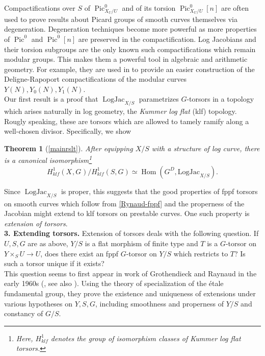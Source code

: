 \documentclass[a4paper,11pt]{amsart} %
\numberwithin{equation}{subsection}
\newcommand{\on}[1]{\operatorname{#1}}
\newcommand{\Hom}{\operatorname{Hom}}
\theoremstyle{definition}
\theoremstyle{plain}%
\newtheorem{theorem}[definition]{Theorem}
\theoremstyle{remark}
\begin{document}
Compactifications over $S$ of $\on{Pic}^0_{X_U/U}$ and of its torsion $\on{Pic}^0_{X_U/U}[n]$ are often used to prove results about Picard groups of smooth curves themselves via degeneration. Degeneration techniques become more powerful as more properties of $\on{Pic}^0$ and $\on{Pic}^0[n]$ are preserved in the compactification. Log Jacobians and their torsion subgroups are the only known such compactifications which remain modular groups. This makes them a powerful tool in algebraic and arithmetic geometry. For example, they are used in \cite{Kajiwara2013Logarithmic-abe} to provide an easier construction of the Deligne-Rapoport compactifications of the modular curves $Y(N),Y_0(N),Y_1(N)$.\\

Our first result is a proof that $\on{LogJac}_{X/S}$ parametrizes $G$-torsors in a topology which arises naturally in log geometry, the \emph{Kummer log flat} (klf) topology. Rougly speaking, these are torsors which are allowed to tamely ramify along a well-chosen divisor. Specifically, we show

\begin{theorem}[\ref{mainrslt}]\label{thm1}
After equipping $X/S$ with a structure of log curve, there is a canonical isomorphism\footnote{Here, $H^1_{klf}$ denotes the group of isomorphism classes of Kummer log flat torsors.}
 \[
 H^1_{klf}(X_{},G_{})/H^1_{klf}(S,G) \simeq   {\Hom}(G_{}^D, \mathrm{LogJac}_{X/S}).
 \]
\end{theorem}
Since $\on{LogJac}_{X/S}$ is proper, this suggests that the good properties of fppf torsors on smooth curves which follow from \ref{Rynaud-fppf} and the properness of the Jacobian might extend to klf torsors on prestable curves. One such property is \emph{extension of torsors}.\\

\noindent\textbf{3. Extending torsors.} Extension of torsors deals with the following question. If $U,S,G$ are as above, $Y/S$ is a flat morphism of finite type and $T$ is a $G$-torsor on $Y\times_S U \to U$, does there exist an fppf $G$-torsor on $Y/S$ which restricts to $T$? Is such a torsor unique if it exists?\\

This question seems to first appear in work of Grothendieck and Raynaud in the early 1960s (\cite[Exposé X]{GrothRev}, see also \cite[Theorem 5.7.10]{FundamentalGp}). Using the theory of specialization of the \'etale fundamental group, they prove the existence and uniqueness of extensions under various hypotheses on $Y,S,G$, including smoothness and properness of $Y/S$ and constancy of $G/S$.\\
\end{document}
